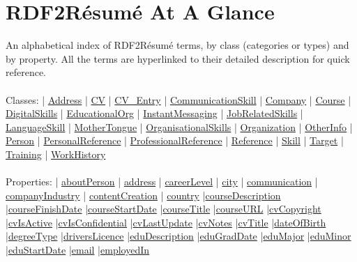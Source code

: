 \documentclass[a4paper,12pt]{article}
\numberwithin{equation}{section}
\begin{document}
\section{RDF2R{\'e}sum{\'e} At A Glance}\label{rdf2resumeataglance}
An alphabetical index of RDF2R{\'e}sum{\'e} terms, by class (categories or types) and by property. All the terms are hyperlinked to their detailed description for quick reference. 
\\\\
Classes:  | \hyperlink{Address}{Address} | \hyperlink{CV}{CV} | \hyperlink{CV_Entry}{CV\_Entry} | \hyperlink{CommunicationSkill}{CommunicationSkill} | \hyperlink{Company}{Company} | \hyperlink{Course}{Course} | \hyperlink{DigitalSkills}{DigitalSkills} | \hyperlink{EducationalOrg}{EducationalOrg} | \hyperlink{InstantMessaging}{InstantMessaging} | \hyperlink{JobRelatedSkills}{JobRelatedSkills} | \hyperlink{LanguageSkill}{LanguageSkill} | \hyperlink{MotherTongue}{MotherTongue} | \hyperlink{OrganisationalSkills}{OrganisationalSkills} | \hyperlink{Organization}{Organization}  | \hyperlink{OtherInfo}{OtherInfo} | \hyperlink{Person}{Person} | \hyperlink{PersonalReference}{PersonalReference} | \hyperlink{ProfessionalReference}{ProfessionalReference} | \hyperlink{Reference}{Reference} | \hyperlink{Skill}{Skill}  | \hyperlink{Target}{Target}  | \hyperlink{Training}{Training} | \hyperlink{WorkHistory}{WorkHistory}
\\\\
Properties: | \hyperlink{aboutPerson}{aboutPerson} | \hyperlink{address}{address} | \hyperlink{careerLevel}{careerLevel} |  \hyperlink{city}{city} | \hyperlink{communication}{communication} | \hyperlink{companyIndustry}{companyIndustry} | \hyperlink{contentCreation}{contentCreation} | \hyperlink{country}{country} |\hyperlink{courseDescription}{courseDescription} |\hyperlink{courseFinishDate}{courseFinishDate} |\hyperlink{courseStartDate}{courseStartDate} |\hyperlink{courseTitle}{courseTitle} |\hyperlink{courseURL}{courseURL} |\hyperlink{cvCopyright}{cvCopyright} |\hyperlink{cvIsActive}{cvIsActive} |\hyperlink{cvIsConfidential}{cvIsConfidential} |\hyperlink{cvLastUpdate}{cvLastUpdate} |\hyperlink{cvNotes}{cvNotes} |\hyperlink{cvTitle}{cvTitle} |\hyperlink{dateOfBirth}{dateOfBirth} |\hyperlink{degreeType}{degreeType} |\hyperlink{driversLicence}{driversLicence} |\hyperlink{eduDescription}{eduDescription} |\hyperlink{eduGradDate}{eduGradDate} |\hyperlink{eduMajor}{eduMajor} |\hyperlink{eduMinor}{eduMinor} |\hyperlink{eduStartDate}{eduStartDate} |\hyperlink{email}{email} |\hyperlink{employedIn}{employedIn} 
\end{document}
